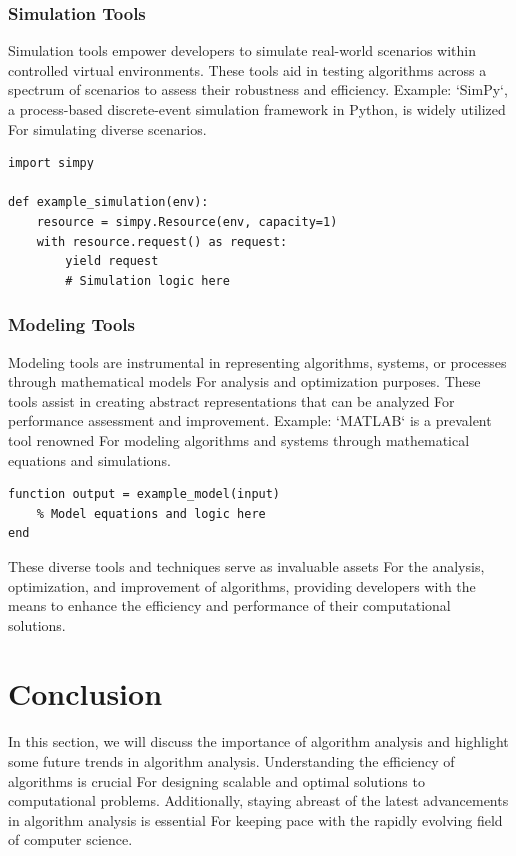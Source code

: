 \documentclass[12pt]{book} %
\begin{document}
\subsubsection{Simulation Tools}
Simulation tools empower developers to simulate real-world scenarios within controlled virtual environments. These tools aid in testing algorithms across a spectrum of scenarios to assess their robustness and efficiency.
\FloatBarrier
Example: 
\FloatBarrier
`SimPy`, a process-based discrete-event simulation framework in Python, is widely utilized For simulating diverse scenarios.
\FloatBarrier
\begin{verbatim}
import simpy

def example_simulation(env):
    resource = simpy.Resource(env, capacity=1)
    with resource.request() as request:
        yield request
        # Simulation logic here
\end{verbatim}
\FloatBarrier

\subsubsection{Modeling Tools}
Modeling tools are instrumental in representing algorithms, systems, or processes through mathematical models For analysis and optimization purposes. These tools assist in creating abstract representations that can be analyzed For performance assessment and improvement.
\FloatBarrier
Example:
\FloatBarrier
`MATLAB` is a prevalent tool renowned For modeling algorithms and systems through mathematical equations and simulations.
\FloatBarrier
\begin{verbatim}
function output = example_model(input)
    % Model equations and logic here
end
\end{verbatim}
\FloatBarrier
These diverse tools and techniques serve as invaluable assets For the analysis, optimization, and improvement of algorithms, providing developers with the means to enhance the efficiency and performance of their computational solutions.

\section{Conclusion}
In this section, we will discuss the importance of algorithm analysis and highlight some future trends in algorithm analysis. Understanding the efficiency of algorithms is crucial For designing scalable and optimal solutions to computational problems. Additionally, staying abreast of the latest advancements in algorithm analysis is essential For keeping pace with the rapidly evolving field of computer science.
\end{document}
